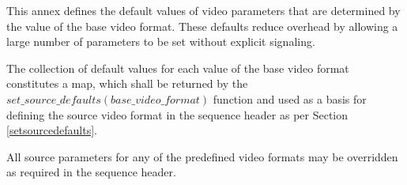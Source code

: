 \label{videoformatdefaults}
This annex defines the default values of video parameters that are determined by the 
value of the base video format. These defaults reduce overhead by allowing a large 
number of parameters to be set without explicit signaling.

The collection of default values for each value of the base video format constitutes 
a map, which shall be returned by the $set\_source\_defaults(base\_video\_format)$
function and used as a basis for defining the source video
format in the sequence header as per Section \ref{setsourcedefaults}.

All source parameters for any of the predefined video formats may be overridden as required in the sequence header.


